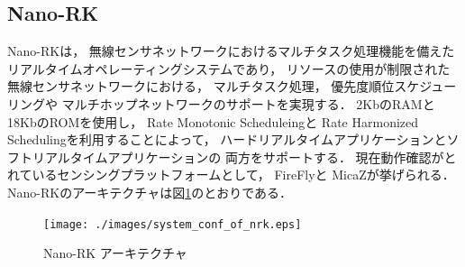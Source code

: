 \subsection{Nano-RK}
Nano-RK\cite{Eswaran:2005:NER:1106608.1106672}は，
無線センサネットワークにおけるマルチタスク処理機能を備えた
リアルタイムオペレーティングシステムであり，
リソースの使用が制限された無線センサネットワークにおける，
マルチタスク処理，
優先度順位スケジューリングや
マルチホップネットワークのサポートを実現する．
2KbのRAMと18KbのROMを使用し，
Rate Monotonic Scheduleingと
Rate Harmonized Scheduling\cite{Rowe:2008:RSS:1475690.1475895}を利用することによって，
ハードリアルタイムアプリケーションとソフトリアルタイムアプリケーションの
両方をサポートする．
現在動作確認がとれているセンシングプラットフォームとして，
FireFly\cite{Rowe_firefly:a}と
MicaZ\cite{Hill:2002:MWP:623308.624560}が挙げられる．
Nano-RKのアーキテクチャは図\ref{fig:system_conf_of_nrk}のとおりである．

\begin{figure}[htbp]
 \begin{center}
  \texttt{[image: ./images/system\_conf\_of\_nrk.eps]}
 \end{center}
 \caption{Nano-RK アーキテクチャ}
 \label{fig:system_conf_of_nrk}
\end{figure}



